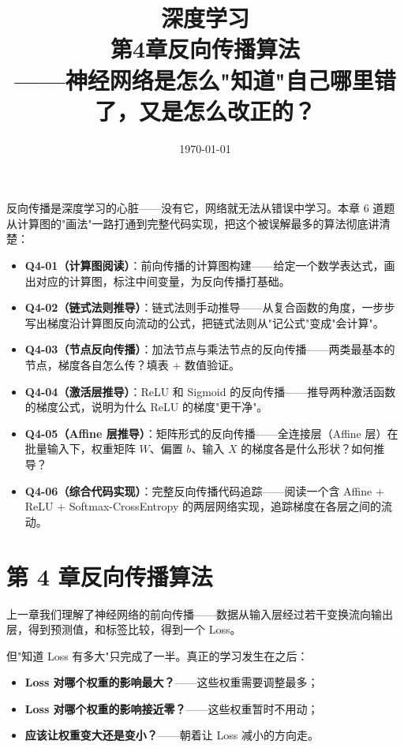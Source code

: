 \documentclass[a4paper,11pt]{ctexart}
\title{\textbf{深度学习\\第4章\quad 反向传播算法}\\[0.5em]
{\large\color{gray}——神经网络是怎么"知道"自己哪里错了，又是怎么改正的？}}
\date{\today}
\begin{document}
\maketitle

\begin{beginnerbox}
    反向传播是深度学习的心脏——没有它，网络就无法从错误中学习。本章 6 道题从计算图的"画法"一路打通到完整代码实现，把这个被误解最多的算法彻底讲清楚：

    \begin{itemize}
        \item \textbf{Q4-01（计算图阅读）}：前向传播的计算图构建——给定一个数学表达式，画出对应的计算图，标注中间变量，为反向传播打基础。
        \item \textbf{Q4-02（链式法则推导）}：链式法则手动推导——从复合函数的角度，一步步写出梯度沿计算图反向流动的公式，把链式法则从"记公式"变成"会计算"。
        \item \textbf{Q4-03（节点反向传播）}：加法节点与乘法节点的反向传播——两类最基本的节点，梯度各自怎么传？填表 + 数值验证。
        \item \textbf{Q4-04（激活层推导）}：ReLU 和 Sigmoid 的反向传播——推导两种激活函数的梯度公式，说明为什么 ReLU 的梯度"更干净"。
        \item \textbf{Q4-05（Affine 层推导）}：矩阵形式的反向传播——全连接层（Affine 层）在批量输入下，权重矩阵 $W$、偏置 $b$、输入 $X$ 的梯度各是什么形状？如何推导？
        \item \textbf{Q4-06（综合代码实现）}：完整反向传播代码追踪——阅读一个含 Affine + ReLU + Softmax-CrossEntropy 的两层网络实现，追踪梯度在各层之间的流动。
    \end{itemize}
\end{beginnerbox}

\section{第 4 章\quad 反向传播算法}

上一章我们理解了神经网络的前向传播——数据从输入层经过若干变换流向输出层，得到预测值，和标签比较，得到一个 Loss。

但"知道 Loss 有多大"只完成了一半。真正的学习发生在之后：

\begin{itemize}
    \item \textbf{Loss 对哪个权重的影响最大？}——这些权重需要调整最多；
    \item \textbf{Loss 对哪个权重的影响接近零？}——这些权重暂时不用动；
    \item \textbf{应该让权重变大还是变小？}——朝着让 Loss 减小的方向走。
\end{itemize}
\end{document}
